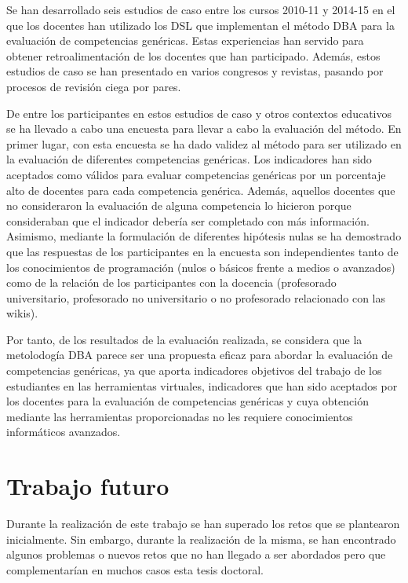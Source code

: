 Se han desarrollado seis estudios de caso entre los cursos 2010-11 y 2014-15 en el que los docentes han utilizado los DSL que implementan el método DBA para la evaluación de competencias genéricas. Estas experiencias han servido para obtener retroalimentación de los docentes que han participado. Además, estos estudios de caso se han presentado en varios congresos y revistas, pasando por procesos de revisión ciega por pares.

De entre los participantes en estos estudios de caso y otros contextos educativos se ha llevado a cabo una encuesta para llevar a cabo la evaluación del método. En primer lugar, con esta encuesta se ha dado validez al método para ser utilizado en la evaluación de diferentes competencias genéricas. Los indicadores han sido aceptados como válidos para evaluar competencias genéricas por un porcentaje alto de docentes para cada competencia genérica. Además, aquellos docentes que no consideraron la evaluación de alguna competencia lo hicieron porque consideraban que el indicador debería ser completado con más información. Asimismo, mediante la formulación de diferentes hipótesis nulas se ha demostrado que las respuestas de los participantes en la encuesta son independientes tanto de los conocimientos de programación (nulos o básicos frente a medios o avanzados) como de la relación de los participantes con la docencia (profesorado universitario, profesorado no universitario o no profesorado relacionado con las wikis).

Por tanto, de los resultados de la evaluación realizada, se considera que la metolodogía DBA parece ser una propuesta eficaz para abordar la evaluación de competencias genéricas, ya que aporta indicadores objetivos del trabajo de los estudiantes en las herramientas virtuales, indicadores que han sido aceptados por los docentes para la evaluación de competencias genéricas y cuya obtención mediante las herramientas proporcionadas no les requiere conocimientos informáticos avanzados.



\section{Trabajo futuro}

Durante la realización de este trabajo se han superado los retos que se plantearon inicialmente. Sin embargo, durante la realización de la misma, se han encontrado algunos problemas o nuevos retos que no han llegado a ser abordados pero que complementarían en muchos casos esta tesis doctoral.

